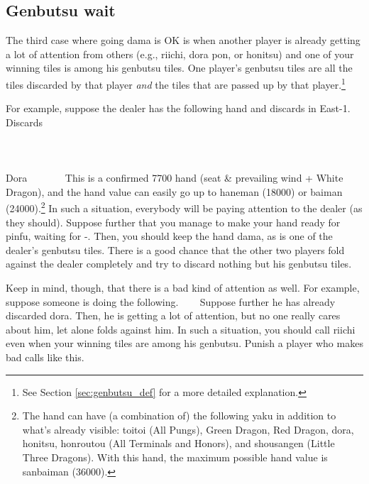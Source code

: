 \subsection{{\jap Genbutsu} wait}  \label{sec:genbutsu}
The third case where going {\jap dama} is OK is when another player is already getting a lot of attention from others (e.g., riichi, {\jap dora} {\jap pon}, or {\jap honitsu}) and one of your winning tiles is among his {\jap genbutsu} tiles.
One player's {\jap genbutsu} tiles are all the tiles discarded by that player \emph{and} the tiles that are passed up by that player.\footnote{See Section \ref{sec:genbutsu_def} for a more detailed explanation.}

\bigskip
For example, suppose the dealer has the following hand and discards in East-1. 
\bp
\vspace{-20pt}
{\small Discards}\\ \vspace{-10pt}
\xi{}\\
\vspace{-10pt}
\hspace{-35pt}\\
\vspace{-10pt}
\ep
\bp
{}
\rbai\bai\bai~~\dong\dong\rdong~~\\
\hfill\footnotesize{{\jap Dora}~~~~~~~}
\ep
This is a confirmed 7700 hand (seat \& prevailing wind + White Dragon), and the hand value can easily go up to {\jap haneman} (18000) or {\jap baiman} (24000).\footnote{The hand can have (a combination of) the following {\jap yaku} in addition to what's already visible: {\jap toitoi} (All Pungs), Green Dragon, Red Dragon, {\jap dora}, {\jap honitsu}, {\jap honroutou} (All Terminals and Honors), and {\jap shousangen} (Little Three Dragons). With this hand, the maximum possible hand value is {\jap sanbaiman} (36000).} 
In such a situation, everybody will be paying attention to the dealer (as they should). Suppose further that you manage to make your hand ready for {\jap pinfu}, waiting for {\LARGE{}-}. Then, you should keep the hand {\jap dama}, as {\LARGE{}} is one of the dealer's {\jap genbutsu} tiles. There is a good chance that the other two players fold against the dealer completely and try to discard nothing but his {\jap genbutsu} tiles. 

\bigskip

Keep in mind, though, that there is a bad kind of attention as well. For example, suppose someone is doing the following.
\bp
{} ~\zhong\zhong\rzhong~~
\ep
Suppose further he has already discarded {\jap dora}. Then, he is getting a lot of attention, but no one really cares about him, let alone folds against him. In such a situation, you should call riichi even when your winning tiles are among his {\jap genbutsu}. Punish a player who makes bad calls like this.


